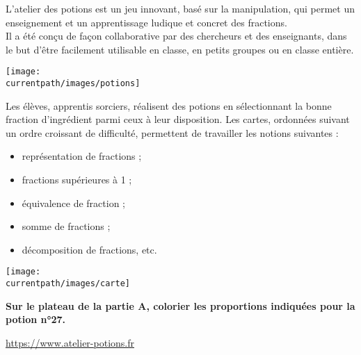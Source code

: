 \begin{enigme}
    L’atelier des potions est un jeu innovant, basé sur la manipulation, qui permet un enseignement et un apprentissage ludique et concret des fractions. \\  
Il a été conçu de façon collaborative par des chercheurs et des enseignants, dans le but d'être facilement utilisable en classe, en petits groupes ou en classe entière. \\
    \begin{center}
      \texttt{[image: \\currentpath/images/potions]}
    \end{center}

    \begin{minipage}{0.7\linewidth}
        Les élèves, apprentis sorciers, réalisent des potions en sélectionnant la bonne fraction d’ingrédient parmi ceux à leur disposition. Les cartes, ordonnées suivant un ordre croissant de difficulté, permettent de travailler les notions suivantes :
        \begin{itemize}
        \item représentation de fractions ;
        \item fractions supérieures à 1 ;
        \item équivalence de fraction ;
        \item somme de fractions ;
        \item décomposition de fractions, etc.
        \end{itemize}
    \end{minipage}
    \hspace*{5mm}
    \begin{minipage}{0.3\linewidth}    
        \begin{center}
           \texttt{[image: \\currentpath/images/carte]}
        \end{center}
    \end{minipage}

    \textbf{Sur le plateau de la partie A, colorier les proportions indiquées pour la potion n°27.}
    \vfill
    \begin{flushright}
    \href{https://www.atelier-potions.fr}{{\small https://www.atelier-potions.fr}}
    \end{flushright}
\end{enigme}

